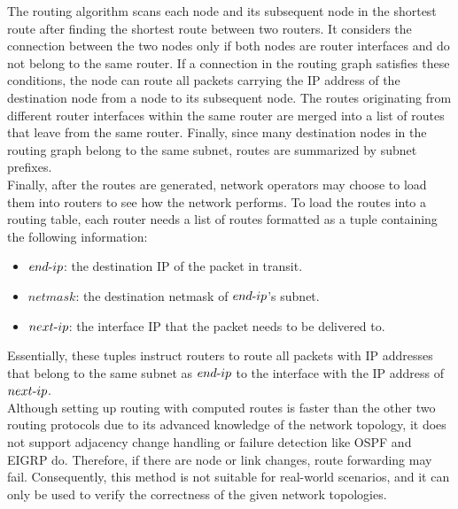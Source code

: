 \documentclass{uiucthesis2021}
\begin{document}
\noindent The routing algorithm scans each node and its subsequent node in the shortest route after finding the shortest route between two routers. It considers the connection between the two nodes only if both nodes are router interfaces and do not belong to the same router. If a connection in the routing graph satisfies these conditions, the node can route all packets carrying the IP address of the destination node from a node to its subsequent node. The routes originating from different router interfaces within the same router are merged into a list of routes that leave from the same router. Finally, since many destination nodes in the routing graph belong to the same subnet, routes are summarized by subnet prefixes.\\

\noindent Finally, after the routes are generated, network operators may choose to load them into routers to see how the network performs. To load the routes into a routing table, each router needs a list of routes formatted as a tuple containing the following information: 

\begin{itemize}
    \item $end{\text -}ip$: the destination IP of the packet in transit.
    \item $netmask$: the destination netmask of $end{\text -}ip$'s subnet.
    \item $next{\text -}ip$: the interface IP that the packet needs to be delivered to.
\end{itemize}

\noindent Essentially, these tuples instruct routers to route all packets with IP addresses that belong to the same subnet as $end{\text -}ip$ to the interface with the IP address of $next{\text-}ip$.\\


\noindent Although setting up routing with computed routes is faster than the other two routing protocols due to its advanced knowledge of the network topology, it does not support adjacency change handling or failure detection like OSPF and EIGRP do. Therefore, if there are node or link changes, route forwarding may fail. Consequently, this method is not suitable for real-world scenarios, and it can only be used to verify the correctness of the given network topologies.\\

\label{s342}
\end{document}
